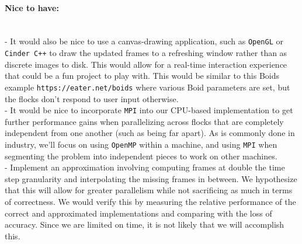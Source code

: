 \documentclass[12pt]{article}
\begin{document}
\paragraph*{Nice to have:}$~$\\
- It would also be nice to use a canvas-drawing application, such as \texttt{OpenGL} or \texttt{Cinder C++} to draw the updated frames to a refreshing window rather than as discrete images to disk. This would allow for a real-time interaction experience that could be a fun project to play with. This would be similar to this Boids example \texttt{https://eater.net/boids} where various Boid parameters are set, but the flocks don't respond to user input otherwise. \\
- It would be nice to incorporate \texttt{MPI} into our CPU-based implementation to get further performance gains when parallelizing across flocks that are completely independent from one another (such as being far apart). As is commonly done in industry, we'll focus on using \texttt{OpenMP} within a machine, and using \texttt{MPI} when segmenting the problem into independent pieces to work on other machines.\\
- Implement an approximation involving computing frames at double the time step granularity and interpolating the missing frames in between. We hypothesize that this will allow for greater parallelism while not sacrificing as much in terms of correctness. We would verify this by measuring the relative performance of the correct and approximated implementations and comparing with the loss of accuracy. Since we are limited on time, it is not likely that we will accomplish this.\\
\end{document}
